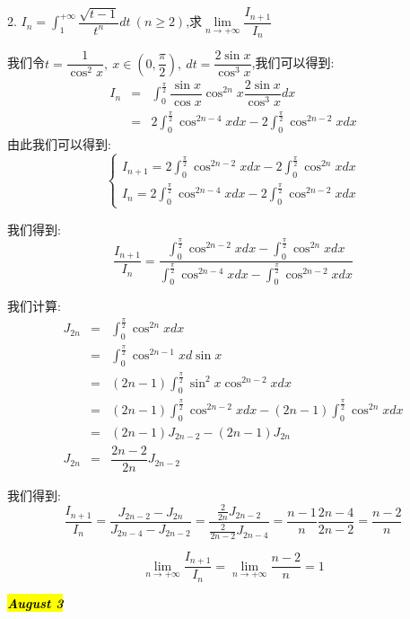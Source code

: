 2. $I_{n}=\int_{1}^{+\infty}\dfrac{\sqrt{t-1}}{t^n}dt\ (n\geq 2)$,求$\lim\limits_{n\rightarrow+\infty}\dfrac{I_{n+1}}{I_{n}}$
\begin{solution}
	
	我们令$t=\dfrac{1}{\cos^2 x},\ x\in(0,\dfrac{\pi}{2}),\ dt=\dfrac{2\sin x}{\cos^3 x}$,我们可以得到: 
	\begin{eqnarray*}
		I_{n}&=&\int_{0}^{\frac{\pi}{2}}\dfrac{\sin x}{\cos x}\cos^{2n}x\dfrac{2\sin x}{\cos^3 x}dx\\
		&=&2\int_{0}^{\frac{\pi}{2}}\cos^{2n-4}xdx-2\int_{0}^{\frac{\pi}{2}}\cos^{2n-2}xdx
	\end{eqnarray*}
	由此我们可以得到: 
	$$\left\lbrace
	\begin{array}{l}
		I_{n+1}=2\int_{0}^{\frac{\pi}{2}}\cos^{2n-2}xdx-2\int_{0}^{\frac{\pi}{2}}\cos^{2n}xdx\\
		I_{n}=2\int_{0}^{\frac{\pi}{2}}\cos^{2n-4}xdx-2\int_{0}^{\frac{\pi}{2}}\cos^{2n-2}xdx
	\end{array}
	\right. $$
	
	我们得到: 
	$$\dfrac{I_{n+1}}{I_{n}}=\dfrac{\int_{0}^{\frac{\pi}{2}}\cos^{2n-2}xdx-\int_{0}^{\frac{\pi}{2}}\cos^{2n}xdx}{\int_{0}^{\frac{\pi}{2}}\cos^{2n-4}xdx-\int_{0}^{\frac{\pi}{2}}\cos^{2n-2}xdx}$$
	
	我们计算: 
	\begin{eqnarray*}
		J_{2n}&=&\int_{0}^{\frac{\pi}{2}}\cos^{2n}xdx\\
		&=&\int_{0}^{\frac{\pi}{2}}\cos^{2n-1}xd\sin x\\
		&=&(2n-1)\int_{0}^{\frac{\pi}{2}}\sin^{2} x\cos^{2n-2}xdx\\
		&=&(2n-1)\int_{0}^{\frac{\pi}{2}}\cos^{2n-2}xdx-(2n-1)\int_{0}^{\frac{\pi}{2}}\cos^{2n}xdx\\
		&=&(2n-1)J_{2n-2}-(2n-1)J_{2n}\\
		J_{2n}&=&\dfrac{2n-2}{2n}J_{2n-2}
	\end{eqnarray*}

	我们得到: 
	$$\dfrac{I_{n+1}}{I_{n}}=\dfrac{J_{2n-2}-J_{2n}}{J_{2n-4}-J_{2n-2}}=\dfrac{\frac{2}{2n}J_{2n-2}}{\frac{2}{2n-2}J_{2n-4}}=\dfrac{n-1}{n}\dfrac{2n-4}{2n-2}=\dfrac{n-2}{n}$$
	
	$$\lim\limits_{n\rightarrow+\infty}\dfrac{I_{n+1}}{I_{n}}=\lim\limits_{n\rightarrow+\infty}\dfrac{n-2}{n}=1$$
\end{solution}

\hl{\textbf{\textit{August 3}}}

